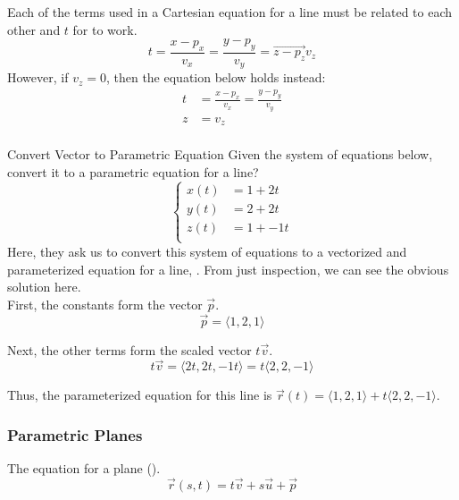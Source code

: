 Each of the terms used in a Cartesian equation for a line must be related to each other and $t$ for  to work.
\begin{equation}\label{eq:Parametric_Cartesian_Line}
  t = \frac{x-p_{x}}{v_{x}} = \frac{y-p_{y}}{v_{y}} = \vec{z-p_{z}}{v_{z}}
\end{equation}
However, if $v_{z} = 0$, then the equation below holds instead:
\begin{equation*}
  \begin{aligned}
    t &= \frac{x-p_{x}}{v_{x}} = \frac{y-p_{y}}{v_{y}} \\
    z &= v_{z} \\
\end{aligned}
\end{equation*}

\begin{example}[Lecture 4]{Convert Vector to Parametric Equation}
  Given the system of equations below, convert it to a parametric equation for a line?
  \begin{equation*}
    \begin{cases}
      x(t) &= 1 + 2t \\
      y(t) &= 2 + 2t \\
      z(t) &= 1 + -1t \\
    \end{cases}
  \end{equation*}
  \tcblower{}
  Here, they ask us to convert this system of equations to a vectorized and parameterized equation for a line, .
  From just inspection, we can see the obvious solution here. \\
  First, the constants form the vector $\vec{p}$.
  \begin{equation*}
    \vec{p} = \langle 1, 2, 1 \rangle
  \end{equation*}

  Next, the other terms form the scaled vector $t\vec{v}$.
  \begin{equation*}
    t\vec{v} = \langle 2t, 2t, -1t \rangle = t \langle 2, 2, -1 \rangle
  \end{equation*}

  Thus, the parameterized equation for this line is $\vec{r}(t) = \langle 1, 2, 1 \rangle + t \langle 2, 2, -1 \rangle$.
\end{example}

\subsubsection{Parametric Planes}\label{subsubsec:Parametric_Planes}
The  equation for a plane ().
\begin{equation}\label{eq:Parametric_Plane}
  \vec{r}(s, t) = t\vec{v} + s\vec{u} + \vec{p}
\end{equation}

